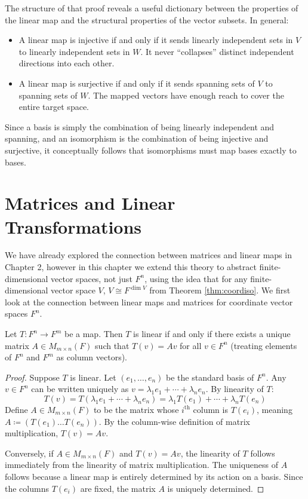 \documentclass[../linear_algebra_and_groups.tex]{subfiles}
\begin{document}
\begin{remark}
    The structure of that proof reveals a useful dictionary between the properties of the linear map and the structural properties of the vector subsets. In general:
    \begin{itemize}
        \item A linear map is injective if and only if it sends linearly independent sets in $V$ to linearly independent sets in $W$. It never ``collapses'' distinct independent directions into each other.
        \item A linear map is surjective if and only if it sends spanning sets of $V$ to spanning sets of $W$. The mapped vectors have enough reach to cover the entire target space.
    \end{itemize}
    Since a basis is simply the combination of being linearly independent and spanning, and an isomorphism is the combination of being injective and surjective, it conceptually follows that isomorphisms must map bases exactly to bases.
\end{remark}

\section{Matrices and Linear Transformations}

We have already explored the connection between matrices and linear maps in Chapter 2, however in this chapter we extend this theory to abstract finite-dimensional vector spaces, not just $F^n$, using the idea that for any finite-dimensional vector space $V$, $V\cong F^{\dim V}$ from Theorem \ref{thm:coordiso}.
We first look at the connection between linear maps and matrices for coordinate vector spaces $F^n$.

\begin{proposition}
    \begin{shaded*}
        Let $T:F^n\to F^m$ be a map. Then $T$ is linear if and only if there exists a unique matrix $A\in M_{m\times n}(F)$ such that $T(v)=Av$ for all $v\in F^n$ (treating elements of $F^n$ and $F^m$ as column vectors).
    \end{shaded*}
\end{proposition}
\begin{proof}
    Suppose $T$ is linear. Let $(e_1,\dots,e_n)$ be the standard basis of $F^n$. Any $v\in F^n$ can be written uniquely as $v = \lambda_1e_1+\cdots+\lambda_ne_n$. By linearity of $T$:
    \[ T(v) = T(\lambda_1e_1+\cdots+\lambda_ne_n) = \lambda_1T(e_1)+\cdots+\lambda_nT(e_n) \]
    Define $A\in M_{m\times n}(F)$ to be the matrix whose $i^{\mathrm{th}}$ column is $T(e_i)$, meaning $A \coloneqq (T(e_1)\dots T(e_n))$. By the column-wise definition of matrix multiplication, $T(v)=Av$.
    
    Conversely, if $A\in M_{m\times n}(F)$ and $T(v)=Av$, the linearity of $T$ follows immediately from the linearity of matrix multiplication. The uniqueness of $A$ follows because a linear map is entirely determined by its action on a basis. Since the columns $T(e_i)$ are fixed, the matrix $A$ is uniquely determined.
    \qedhere
\end{proof}
\end{document}
